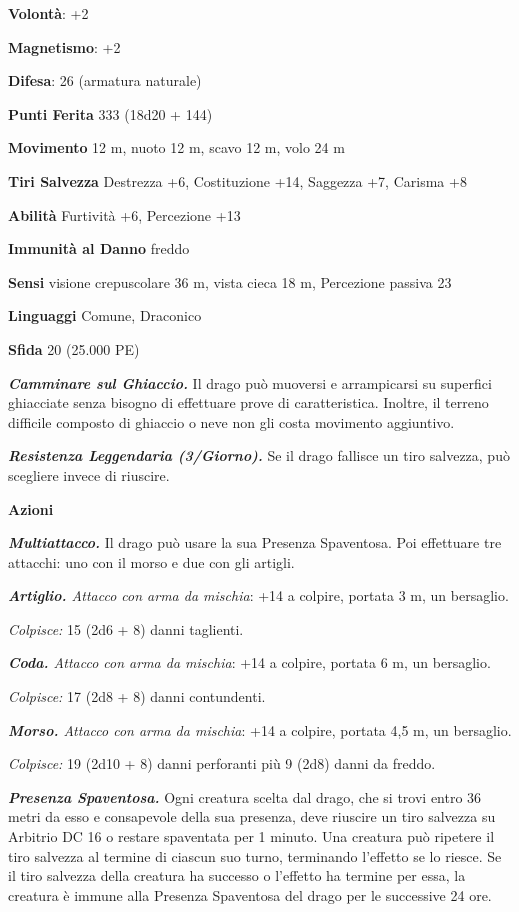 \begin{multicols}{2}
\textbf{Volontà}: +2

\textbf{Magnetismo}: +2

\textbf{Difesa}: 26 (armatura naturale)

\textbf{Punti Ferita} 333 (18d20 + 144)

\textbf{Movimento} 12 m, nuoto 12 m, scavo 12 m, volo 24 m

\textbf{Tiri Salvezza} Destrezza +6, Costituzione +14, Saggezza +7,
Carisma +8

\textbf{Abilità} Furtività +6, Percezione +13

\textbf{Immunità al Danno} freddo

\textbf{Sensi} visione crepuscolare 36 m, vista cieca 18 m, Percezione passiva
23

\textbf{Linguaggi} Comune, Draconico

\textbf{Sfida} 20 (25.000 PE)

\emph{\textbf{Camminare sul Ghiaccio.}} Il drago può muoversi e
arrampicarsi su superfici ghiacciate senza bisogno di effettuare prove
di caratteristica. Inoltre, il terreno difficile composto di ghiaccio o
neve non gli costa movimento aggiuntivo.

\emph{\textbf{Resistenza Leggendaria (3/Giorno).}} Se il drago fallisce
un tiro salvezza, può scegliere invece di riuscire.

\textbf{Azioni}

\emph{\textbf{Multiattacco.}} Il drago può usare la sua Presenza
Spaventosa. Poi effettuare tre attacchi: uno con il morso e due con gli
artigli.

\emph{\textbf{Artiglio.} Attacco con arma da mischia}: +14 a colpire,
portata 3 m, un bersaglio.

\emph{Colpisce:} 15 (2d6 + 8) danni taglienti.

\emph{\textbf{Coda.} Attacco con arma da mischia}: +14 a colpire,
portata 6 m, un bersaglio.

\emph{Colpisce:} 17 (2d8 + 8) danni contundenti.

\emph{\textbf{Morso.} Attacco con arma da mischia}: +14 a colpire,
portata 4,5 m, un bersaglio.

\emph{Colpisce:} 19 (2d10 + 8) danni perforanti più 9 (2d8) danni da
freddo.

\emph{\textbf{Presenza Spaventosa.}} Ogni creatura scelta dal drago, che
si trovi entro 36 metri da esso e consapevole della sua presenza, deve
riuscire un tiro salvezza su Arbitrio DC 16 o restare spaventata per 1
minuto. Una creatura può ripetere il tiro salvezza al termine di ciascun
suo turno, terminando l'effetto se lo riesce. Se il tiro salvezza della
creatura ha successo o l'effetto ha termine per essa, la creatura è
immune alla Presenza Spaventosa del drago per le successive 24 ore.


\end{multicols}
